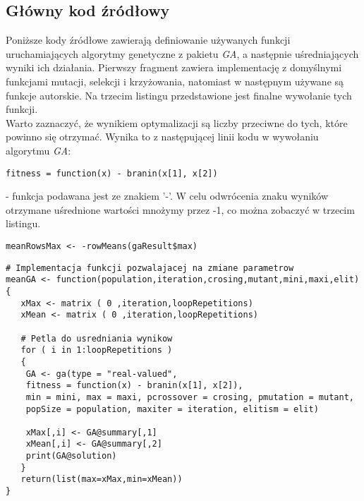 \subsection{Główny kod źródłowy}

Poniższe kody źródłowe zawierają definiowanie używanych funkcji uruchamiających algorytmy genetyczne z pakietu \textit{GA}, a następnie uśredniających wyniki ich działania. Pierwszy fragment zawiera implementację z domyślnymi funkcjami mutacji, selekcji i krzyżowania, natomiast w następnym używane są funkcje autorskie. Na trzecim listingu przedstawione jest finalne wywołanie tych funkcji.\\
Warto zaznaczyć, że wynikiem optymalizacji są liczby przeciwne do tych, które powinno się otrzymać. Wynika to z następującej linii kodu w wywołaniu algorytmu \textit{GA}:\\

\begin{lstlisting}[linewidth=10.0cm]
   fitness = function(x) - branin(x[1], x[2])
\end{lstlisting}
\vline

- funkcja podawana jest ze znakiem '-'. W celu odwrócenia znaku wyników otrzymane uśrednione wartości mnożymy przez -1, co można zobaczyć w trzecim listingu.\\

\begin{lstlisting}[linewidth=10.0cm]
   meanRowsMax <- -rowMeans(gaResult$max)
\end{lstlisting}


\newpage

\begin{lstlisting}[linewidth=15.4cm]
# Implementacja funkcji pozwalajacej na zmiane parametrow
meanGA <- function(population,iteration,crosing,mutant,mini,maxi,elit)
{
   xMax <- matrix ( 0 ,iteration,loopRepetitions)   
   xMean <- matrix ( 0 ,iteration,loopRepetitions)  

   # Petla do usredniania wynikow
   for ( i in 1:loopRepetitions )
   {  
	GA <- ga(type = "real-valued",
	fitness = function(x) - branin(x[1], x[2]),
	min = mini, max = maxi, pcrossover = crosing, pmutation = mutant,
	popSize = population, maxiter = iteration, elitism = elit)
	
	xMax[,i] <- GA@summary[,1]
	xMean[,i] <- GA@summary[,2]
	print(GA@solution)
   }
   return(list(max=xMax,min=xMean))
}

\end{lstlisting}


